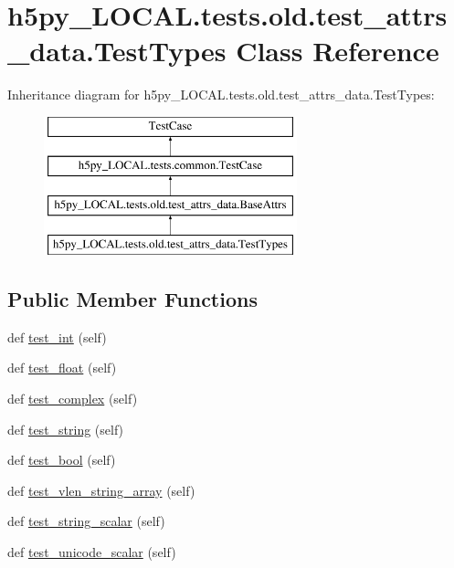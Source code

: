 \hypertarget{classh5py__LOCAL_1_1tests_1_1old_1_1test__attrs__data_1_1TestTypes}{}\section{h5py\+\_\+\+L\+O\+C\+A\+L.\+tests.\+old.\+test\+\_\+attrs\+\_\+data.\+Test\+Types Class Reference}
\label{classh5py__LOCAL_1_1tests_1_1old_1_1test__attrs__data_1_1TestTypes}
Inheritance diagram for h5py\+\_\+\+L\+O\+C\+A\+L.\+tests.\+old.\+test\+\_\+attrs\+\_\+data.\+Test\+Types\+:\begin{figure}[H]
\begin{center}
\leavevmode
\includegraphics[height=4.000000cm]{classh5py__LOCAL_1_1tests_1_1old_1_1test__attrs__data_1_1TestTypes}
\end{center}
\end{figure}
\subsection*{Public Member Functions}
\begin{DoxyCompactItemize}
\item 
def \hyperlink{classh5py__LOCAL_1_1tests_1_1old_1_1test__attrs__data_1_1TestTypes_abde3184a226513cd9ecbbf7e7d7c8c63}{test\+\_\+int} (self)
\item 
def \hyperlink{classh5py__LOCAL_1_1tests_1_1old_1_1test__attrs__data_1_1TestTypes_a0b451ba74d529a77ca17fd21adb24cbe}{test\+\_\+float} (self)
\item 
def \hyperlink{classh5py__LOCAL_1_1tests_1_1old_1_1test__attrs__data_1_1TestTypes_a572bf915cc544ca0d5ab72c627107c89}{test\+\_\+complex} (self)
\item 
def \hyperlink{classh5py__LOCAL_1_1tests_1_1old_1_1test__attrs__data_1_1TestTypes_a3690394824b0d1981290dd17de3aea30}{test\+\_\+string} (self)
\item 
def \hyperlink{classh5py__LOCAL_1_1tests_1_1old_1_1test__attrs__data_1_1TestTypes_a661ed519a061dc083fd4890c482a9cf8}{test\+\_\+bool} (self)
\item 
def \hyperlink{classh5py__LOCAL_1_1tests_1_1old_1_1test__attrs__data_1_1TestTypes_a933ca5c74619adb2495f3b23154f51a7}{test\+\_\+vlen\+\_\+string\+\_\+array} (self)
\item 
def \hyperlink{classh5py__LOCAL_1_1tests_1_1old_1_1test__attrs__data_1_1TestTypes_a52eb5483a79ab613f83ed8a290afca35}{test\+\_\+string\+\_\+scalar} (self)
\item 
def \hyperlink{classh5py__LOCAL_1_1tests_1_1old_1_1test__attrs__data_1_1TestTypes_a082ffba1c8d25fc0818aca2e4970af9e}{test\+\_\+unicode\+\_\+scalar} (self)
\end{DoxyCompactItemize}
